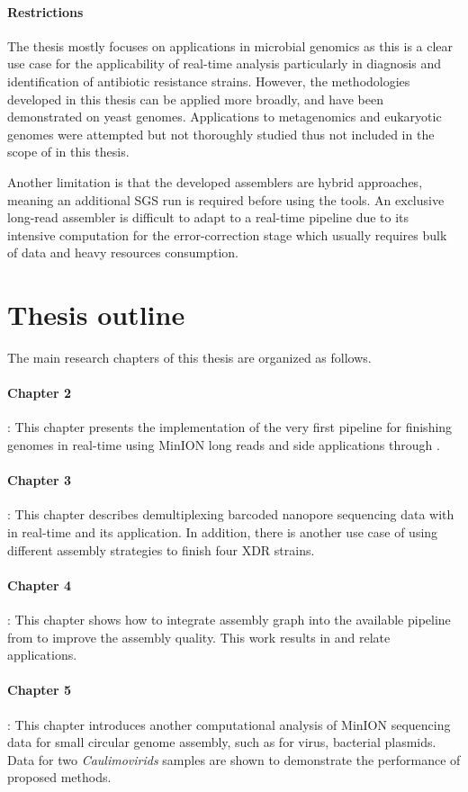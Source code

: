 \paragraph{Restrictions}
The thesis mostly focuses on applications in microbial genomics as this is a clear use case for the applicability of real-time analysis particularly in diagnosis and identification of antibiotic resistance strains.  However, the methodologies developed in this thesis can be applied more broadly, and have been demonstrated on yeast genomes. Applications to metagenomics and eukaryotic genomes were attempted but not thoroughly studied thus not included in the scope of in this thesis.

Another limitation is that the developed assemblers are hybrid approaches, meaning an additional SGS run is required before using the tools. An exclusive long-read assembler is difficult to adapt to a real-time pipeline due to its intensive computation for the error-correction stage which usually requires bulk of data and heavy resources consumption.
\section{Thesis outline}
The main research chapters of this thesis are organized as follows.
\paragraph{Chapter 2}: 
This chapter presents the implementation of the very first pipeline for finishing genomes in real-time using MinION long reads and side applications through \npscarf{}.
\paragraph{Chapter 3}:
This chapter describes demultiplexing barcoded nanopore sequencing data with \npbarcode{} in real-time and its application. In addition, there is another use case of using different assembly strategies to finish four XDR \kp{} strains.
\paragraph{Chapter 4}: 
This chapter shows how to integrate assembly graph into the available pipeline from \npscarf{} to improve the assembly quality. This work results in \npgraph{} and relate applications.
\paragraph{Chapter 5}: 
This chapter introduces another computational analysis of MinION sequencing data for small circular genome assembly, such as for virus, bacterial plasmids. Data for two \emph{Caulimovirids} samples are shown to demonstrate the performance of proposed methods.
